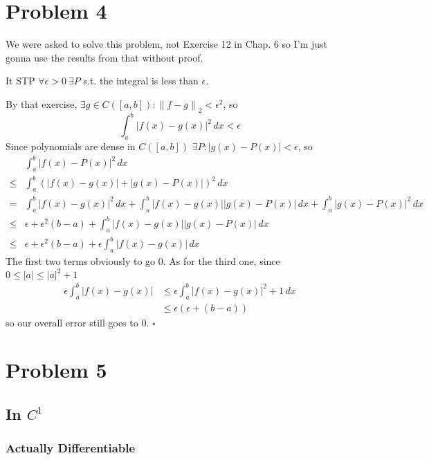 \documentclass[12pt]{article}
\newcommand{\norm}[1]{\left\lVert#1\right\rVert}
\begin{document}
\pagebreak

\section{Problem 4}

We were asked to solve this problem, not Exercise 12 in Chap. 6 so I'm just gonna use the results from that without proof.

It STP $\forall \epsilon > 0\ \exists P$ s.t. the integral is less than $\epsilon$.

By that exercise, $\exists g \in C([a, b]): \norm{f-g}_2 < \epsilon^2$, so
\[\int_{a}^{b} |f(x)-g(x)|^2\,dx < \epsilon\]
Since polynomials are dense in $C([a, b])$ $\exists P: |g(x)-P(x)| < \epsilon$, so
\begin{align*}
        & \int_{a}^{b} |f(x)-P(x)|^2\,dx \\
  \le{} & \int_{a}^{b} (|f(x)-g(x)| + |g(x)-P(x)|)^2\,dx                                                   \\
  =     & \int_{a}^{b} |f(x)-g(x)|^2\,dx + \int_{a}^{b} |f(x)-g(x)||g(x)-P(x)|\,dx + \int_{a}^{b} |g(x)-P(x)|^2\,dx \\
  \le{} & \epsilon + \epsilon^2(b-a) + \int_{a}^{b} |f(x)-g(x)||g(x)-P(x)|\,dx \\
  \le{} & \epsilon + \epsilon^2(b-a) + \epsilon\int_{a}^{b} |f(x)-g(x)|\,dx
\end{align*}
The first two terms obviously to go $0$.
As for the third one, since $0 \le |a| \le |a|^2+1$
\begin{align*}
  \epsilon\int_{a}^{b} |f(x)-g(x)|
  &\le \epsilon\int_{a}^{b} |f(x)-g(x)|^2+1\,dx \\
  &\le \epsilon(\epsilon + (b-a))
\end{align*}
so our overall error still goes to $0$. $\square$

\pagebreak

\section{Problem 5}

\subsection{In \texorpdfstring{$C^1$}{C1}}

\subsubsection{Actually Differentiable}
\end{document}
